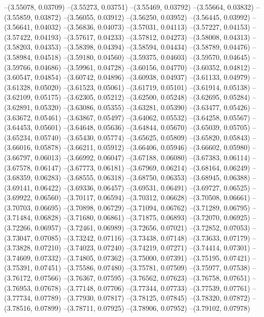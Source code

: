 --(3.55078, 0.03709)
--(3.55273, 0.03751)
--(3.55469, 0.03792)
--(3.55664, 0.03832)
--(3.55859, 0.03872)
--(3.56055, 0.03912)
--(3.56250, 0.03952)
--(3.56445, 0.03992)
--(3.56641, 0.04032)
--(3.56836, 0.04073)
--(3.57031, 0.04113)
--(3.57227, 0.04153)
--(3.57422, 0.04193)
--(3.57617, 0.04233)
--(3.57812, 0.04273)
--(3.58008, 0.04313)
--(3.58203, 0.04353)
--(3.58398, 0.04394)
--(3.58594, 0.04434)
--(3.58789, 0.04476)
--(3.58984, 0.04518)
--(3.59180, 0.04560)
--(3.59375, 0.04603)
--(3.59570, 0.04645)
--(3.59766, 0.04686)
--(3.59961, 0.04728)
--(3.60156, 0.04770)
--(3.60352, 0.04812)
--(3.60547, 0.04854)
--(3.60742, 0.04896)
--(3.60938, 0.04937)
--(3.61133, 0.04979)
--(3.61328, 0.05020)
--(3.61523, 0.05061)
--(3.61719, 0.05101)
--(3.61914, 0.05138)
--(3.62109, 0.05175)
--(3.62305, 0.05212)
--(3.62500, 0.05248)
--(3.62695, 0.05284)
--(3.62891, 0.05320)
--(3.63086, 0.05355)
--(3.63281, 0.05390)
--(3.63477, 0.05426)
--(3.63672, 0.05461)
--(3.63867, 0.05497)
--(3.64062, 0.05532)
--(3.64258, 0.05567)
--(3.64453, 0.05601)
--(3.64648, 0.05636)
--(3.64844, 0.05670)
--(3.65039, 0.05705)
--(3.65234, 0.05740)
--(3.65430, 0.05774)
--(3.65625, 0.05809)
--(3.65820, 0.05843)
--(3.66016, 0.05878)
--(3.66211, 0.05912)
--(3.66406, 0.05946)
--(3.66602, 0.05980)
--(3.66797, 0.06013)
--(3.66992, 0.06047)
--(3.67188, 0.06080)
--(3.67383, 0.06114)
--(3.67578, 0.06147)
--(3.67773, 0.06181)
--(3.67969, 0.06214)
--(3.68164, 0.06249)
--(3.68359, 0.06283)
--(3.68555, 0.06318)
--(3.68750, 0.06353)
--(3.68945, 0.06388)
--(3.69141, 0.06422)
--(3.69336, 0.06457)
--(3.69531, 0.06491)
--(3.69727, 0.06525)
--(3.69922, 0.06560)
--(3.70117, 0.06594)
--(3.70312, 0.06628)
--(3.70508, 0.06661)
--(3.70703, 0.06695)
--(3.70898, 0.06729)
--(3.71094, 0.06762)
--(3.71289, 0.06795)
--(3.71484, 0.06828)
--(3.71680, 0.06861)
--(3.71875, 0.06893)
--(3.72070, 0.06925)
--(3.72266, 0.06957)
--(3.72461, 0.06989)
--(3.72656, 0.07021)
--(3.72852, 0.07053)
--(3.73047, 0.07085)
--(3.73242, 0.07116)
--(3.73438, 0.07148)
--(3.73633, 0.07179)
--(3.73828, 0.07210)
--(3.74023, 0.07240)
--(3.74219, 0.07271)
--(3.74414, 0.07301)
--(3.74609, 0.07332)
--(3.74805, 0.07362)
--(3.75000, 0.07391)
--(3.75195, 0.07421)
--(3.75391, 0.07451)
--(3.75586, 0.07480)
--(3.75781, 0.07509)
--(3.75977, 0.07538)
--(3.76172, 0.07566)
--(3.76367, 0.07595)
--(3.76562, 0.07623)
--(3.76758, 0.07651)
--(3.76953, 0.07678)
--(3.77148, 0.07706)
--(3.77344, 0.07733)
--(3.77539, 0.07761)
--(3.77734, 0.07789)
--(3.77930, 0.07817)
--(3.78125, 0.07845)
--(3.78320, 0.07872)
--(3.78516, 0.07899)
--(3.78711, 0.07925)
--(3.78906, 0.07952)
--(3.79102, 0.07978)
